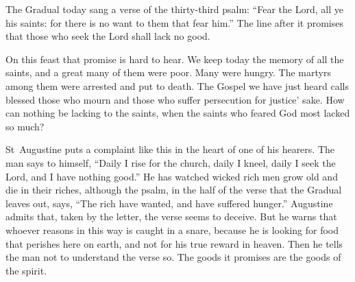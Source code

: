 \raggedcolumns

The Gradual today sang a verse of the thirty-third psalm: ``Fear the Lord,
all ye his saints: for there is no want to them that fear him.'' The line
after it promises that those who seek the Lord shall lack no good.

On this feast that promise is hard to hear. We keep today the memory of all
the saints, and a great many of them were poor. Many were hungry. The martyrs
among them were arrested and put to death. The Gospel we have just heard
calls blessed those who mourn and those who suffer persecution for justice'
sake. How can nothing be lacking to the saints, when the saints who feared
God most lacked so much?

St~Augustine puts a complaint like this in the heart of one of his hearers.
The man says to himself, ``Daily I rise for the church, daily I kneel, daily
I seek the Lord, and I have nothing good.'' He has watched wicked rich men
grow old and die in their riches, although the psalm, in the half of the
verse that the Gradual leaves out, says, ``The rich have wanted, and have
suffered hunger.'' Augustine admits that, taken by the letter, the verse
seems to deceive. But he warns that whoever reasons in this way is caught in
a snare, because he is looking for food that perishes here on earth, and not
for his true reward in heaven. Then he tells the man not to understand the
verse so. The goods it promises are the goods of the spirit.

